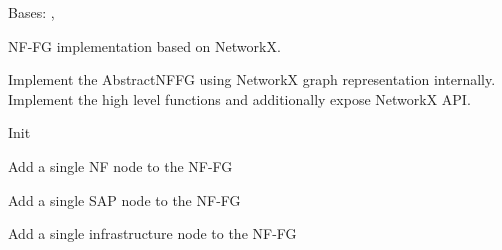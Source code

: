 \documentclass[letterpaper,10pt,english]{sphinxmanual}
\begin{document}

\begin{fulllineitems}
\label{util/nffg:escape.util.nffg.NFFG}
Bases: {\hyperref[util/nffg:escape.util.nffg.AbstractNFFG]{\emph{}}}, 

NF-FG implementation based on NetworkX.

Implement the AbstractNFFG using NetworkX graph representation
internally.  Implement the high level functions and additionally
expose NetworkX API.

\begin{fulllineitems}
\label{util/nffg:escape.util.nffg.NFFG.__init__}
Init

\end{fulllineitems}


\begin{fulllineitems}
\label{util/nffg:escape.util.nffg.NFFG.add_nf}
Add a single NF node to the NF-FG

\end{fulllineitems}


\begin{fulllineitems}
\label{util/nffg:escape.util.nffg.NFFG.add_sap}
Add a single SAP node to the NF-FG

\end{fulllineitems}


\begin{fulllineitems}
\label{util/nffg:escape.util.nffg.NFFG.add_infra}
Add a single infrastructure node to the NF-FG

\end{fulllineitems}


\end{fulllineitems}
\end{document}
